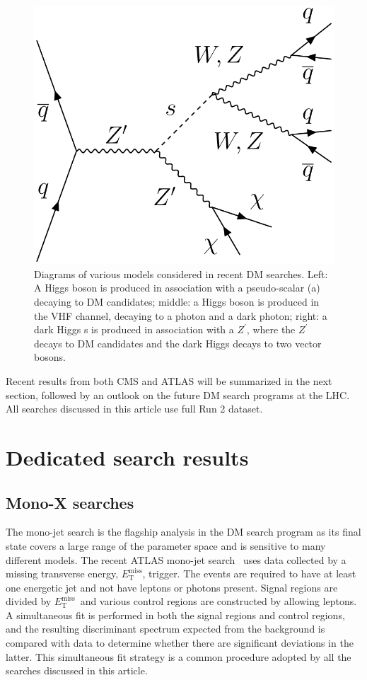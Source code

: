 \documentclass{moriond}
\def\et{E_\mathrm{T}^{\mathrm{miss}}}
\begin{document}
\begin{figure} [htb]
\begin{minipage}{0.32\linewidth}
\centerline{\includegraphics[width=0.7\linewidth]{MonoSVVDiagram}}
\end{minipage}
\caption[]{Diagrams of various models considered in recent DM searches. Left: A Higgs boson is produced in association with a pseudo-scalar (a) decaying to DM candidates; middle: a Higgs boson is produced in the VHF channel, decaying to a photon and a dark photon; right: a dark Higgs s is produced in association with a $Z^{\prime}$, where the $Z^{\prime}$ decays to DM candidates and the dark Higgs decays to two vector bosons.}
\label{fig:diagrams}
\end{figure}

Recent results from both CMS and ATLAS will be summarized in the next section,
followed by an outlook on the future DM search programs at the LHC. All
searches discussed in this article use full Run 2 dataset. 

\section{Dedicated search results}

\subsection{Mono-X searches}

The mono-jet search is the flagship analysis in the DM search program as its final
state covers a large range of the parameter space and is sensitive to many different
models. The recent ATLAS mono-jet search~\cite{monojet} uses data collected by a missing transverse energy, $\et$,
trigger. The events are required to have at least one energetic jet and not
have leptons or photons present. Signal regions are divided by $\et$\ and various control regions are constructed by allowing leptons. A simultaneous fit is performed in both the signal regions and control regions, and the resulting discriminant spectrum expected from the background is compared with data to determine whether there are significant deviations in the latter. This simultaneous fit strategy is a common procedure adopted by all the searches discussed in this article.
\end{document}
